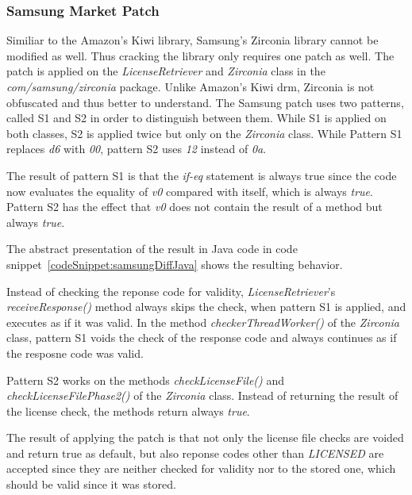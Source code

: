 \subsubsection{Samsung Market Patch}
Similiar to the Amazon's Kiwi library, Samsung's Zirconia library cannot be modified as well.
Thus cracking the library only requires one patch as well.
The patch is applied on the \textit{LicenseRetriever} and \textit{Zirconia} class in the \textit{com/samsung/zirconia} package.
Unlike Amazon's Kiwi \gls{drm}, Zirconia is not obfuscated and thus better to understand.
The Samsung patch uses two patterns, called S1 and S2 in order to distinguish between them.
While S1 is applied on both classes, S2 is applied twice but only on the \textit{Zirconia} class.
\newline
While Pattern S1 replaces \textit{d6} with \textit{00}, pattern S2 uses \textit{12} instead of \textit{0a}.
\newline

The result of pattern S1 is that the \textit{if-eq} statement is always true since the code now evaluates the equality of \textit{v0} compared with itself, which is always \textit{true}.
Pattern S2 has the effect that \textit{v0} does not contain the result of a method but always \textit{true}.
\newline

The abstract presentation of the result in Java code in code snippet~\ref{codeSnippet:samsungDiffJava} shows the resulting behavior.

Instead of checking the reponse code for validity, \textit{LicenseRetriever}'s \textit{receiveResponse()} method always skips the check, when pattern S1 is applied, and executes as if it was valid.
In the method \textit{checkerThreadWorker()} of the \textit{Zirconia} class, pattern S1 voids the check of the response code and always continues as if the resposne code was valid.

Pattern S2 works on the methods \textit{checkLicenseFile()} and \textit{checkLicenseFilePhase2()} of the \textit{Zirconia} class.
Instead of returning the result of the license check, the methods return always \textit{true}.
\newline

The result of applying the patch is that not only the license file checks are voided and return true as default, but also reponse codes other than \textit{LICENSED} are accepted since they are neither checked for validity nor to the stored one, which should be valid since it was stored.
